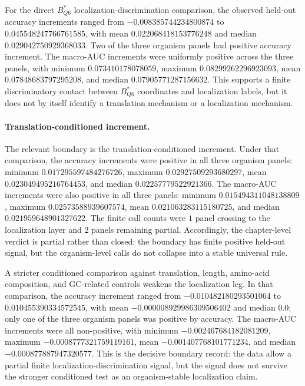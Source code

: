 For the direct $B^{\ast}_{Q6}$ localization-discrimination comparison, the observed held-out accuracy increments ranged from $-0.008385744234800874$ to $0.045548247766761585$, with mean $0.022068418153776248$ and median $0.029042750929368033$. Two of the three organism panels had positive accuracy increment. The macro-AUC increments were uniformly positive across the three panels, with minimum $0.073410178078059$, maximum $0.08299262296923093$, mean $0.07848683797295208$, and median $0.07905771287156632$. This supports a finite discriminatory contact between $B^{\ast}_{Q6}$ coordinates and localization labels, but it does not by itself identify a translation mechanism or a localization mechanism.

\paragraph{Translation-conditioned increment.}
The relevant boundary is the translation-conditioned increment. Under that comparison, the accuracy increments were positive in all three organism panels: minimum $0.017295597484276726$, maximum $0.02927509293680297$, mean $0.023049495216764453$, and median $0.02257779522921366$. The macro-AUC increments were also positive in all three panels: minimum $0.015494311048138809$, maximum $0.02573588939607574$, mean $0.021063283115180725$, and median $0.021959648901327622$. The finite call counts were $1$ panel crossing to the localization layer and $2$ panels remaining partial. Accordingly, the chapter-level verdict is partial rather than closed: the boundary has finite positive held-out signal, but the organism-level calls do not collapse into a stable universal rule.

A stricter conditioned comparison against translation, length, amino-acid composition, and GC-related controls weakens the localization leg. In that comparison, the accuracy increment ranged from $-0.010482180293501064$ to $0.010455390334572545$, with mean $-0.000008929986309506402$ and median $0.0$; only one of the three organism panels was positive by accuracy. The macro-AUC increments were all non-positive, with minimum $-0.002467684182081209$, maximum $-0.0008777321759119161$, mean $-0.001407768101771234$, and median $-0.000877887947320577$. This is the decisive boundary record: the data allow a partial finite localization-discrimination signal, but the signal does not survive the stronger conditioned test as an organism-stable localization claim.

